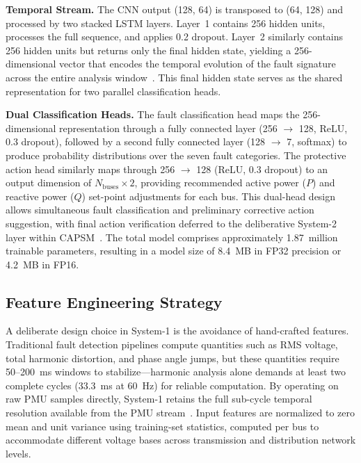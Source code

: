 \documentclass[journal]{IEEEtran}
\begin{document}
\textbf{Temporal Stream.} The CNN output (128, 64) is transposed to (64, 128) and processed by two stacked LSTM layers. Layer~1 contains 256 hidden units, processes the full sequence, and applies 0.2 dropout. Layer~2 similarly contains 256 hidden units but returns only the final hidden state, yielding a 256-dimensional vector that encodes the temporal evolution of the fault signature across the entire analysis window~\cite{ref10}. This final hidden state serves as the shared representation for two parallel classification heads.

\textbf{Dual Classification Heads.} The fault classification head maps the 256-dimensional representation through a fully connected layer (256 $\rightarrow$ 128, ReLU, 0.3 dropout), followed by a second fully connected layer (128 $\rightarrow$ 7, softmax) to produce probability distributions over the seven fault categories. The protective action head similarly maps through 256 $\rightarrow$ 128 (ReLU, 0.3 dropout) to an output dimension of $N_{\text{buses}} \times 2$, providing recommended active power ($P$) and reactive power ($Q$) set-point adjustments for each bus. This dual-head design allows simultaneous fault classification and preliminary corrective action suggestion, with final action verification deferred to the deliberative System-2 layer within CAPSM~\cite{ref15}. The total model comprises approximately 1.87~million trainable parameters, resulting in a model size of 8.4~MB in FP32 precision or 4.2~MB in FP16.

\subsection{Feature Engineering Strategy}

A deliberate design choice in System-1 is the avoidance of hand-crafted features. Traditional fault detection pipelines compute quantities such as RMS voltage, total harmonic distortion, and phase angle jumps, but these quantities require 50--200~ms windows to stabilize---harmonic analysis alone demands at least two complete cycles (33.3~ms at 60~Hz) for reliable computation. By operating on raw PMU samples directly, System-1 retains the full sub-cycle temporal resolution available from the PMU stream~\cite{ref5}. Input features are normalized to zero mean and unit variance using training-set statistics, computed per bus to accommodate different voltage bases across transmission and distribution network levels.
\end{document}
